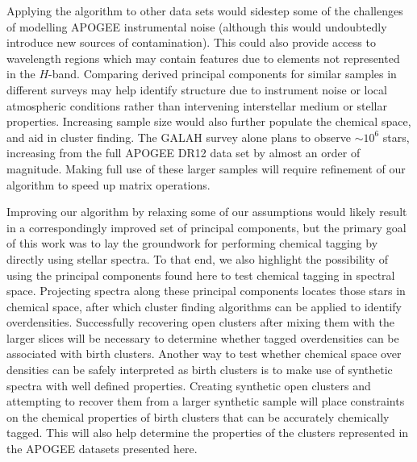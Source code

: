 \documentclass[a4paper,fleqn,usenatbib]{mnras}
\begin{document}
Applying the algorithm to other data sets would sidestep some of the challenges of modelling APOGEE instrumental noise (although this would undoubtedly introduce new sources of contamination). This could also provide access to wavelength regions which may contain features due to elements not represented in the $H$-band. Comparing derived principal components for similar samples in different surveys may help identify structure due to instrument noise or local atmospheric conditions rather than intervening interstellar medium or stellar properties. Increasing sample size would also further populate the chemical space, and aid in cluster finding. The GALAH survey alone plans to observe $\sim 10^6$ stars, increasing from the full APOGEE DR12 data set by almost an order of magnitude. Making full use of these larger samples will require refinement of our algorithm to speed up matrix operations.

Improving our algorithm by relaxing some of our assumptions would likely result in a correspondingly improved set of principal components, but the primary goal of this work was to lay the groundwork for performing chemical tagging by directly using stellar spectra. To that end, we also highlight the possibility of using the principal components found here to test chemical tagging in spectral space. Projecting spectra along these principal components locates those stars in chemical space, after which cluster finding algorithms can be applied to identify overdensities. Successfully recovering open clusters after mixing them with the larger slices will be necessary to determine whether tagged overdensities can be associated with birth clusters. Another way to test whether chemical space over densities can be safely interpreted as birth clusters is to make use of synthetic spectra with well defined properties. Creating synthetic open clusters and attempting to recover them from a larger synthetic sample will place constraints on the chemical properties of birth clusters that can be accurately chemically tagged. This will also help determine the properties of the clusters represented in the APOGEE datasets presented here.




\end{document}
